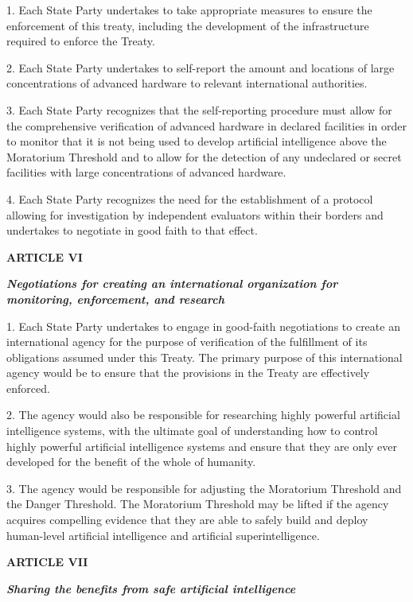 \documentclass[12pt,a4paper]{article}
\begin{document}
1. Each State Party undertakes to take appropriate measures to ensure the enforcement of this treaty, including the development of the infrastructure required to enforce the Treaty.

2. Each State Party undertakes to self-report the amount and locations of large concentrations of advanced hardware to relevant international authorities. 

3. Each State Party recognizes that the self-reporting procedure must allow for the comprehensive verification of advanced hardware in declared facilities in order to monitor that it is not being used to develop artificial intelligence above the Moratorium Threshold and to allow for the detection of any undeclared or secret facilities with large concentrations of advanced hardware.

4. Each State Party recognizes the need for the establishment of a protocol allowing for investigation by independent evaluators within their borders and undertakes to negotiate in good faith to that effect. 

\begin{center}

\textbf{{ARTICLE VI}}

\textbf{\textit{Negotiations for creating an international organization for monitoring, enforcement, and research }}
\end{center}


1. Each State Party undertakes to engage in good-faith negotiations to create an international agency for the purpose of verification of the fulfillment of its obligations assumed under this Treaty. The primary purpose of this international agency would be to ensure that the provisions in the Treaty are effectively enforced. 

2. The agency would also be responsible for researching highly powerful artificial intelligence systems, with the ultimate goal of understanding how to control highly powerful artificial intelligence systems and ensure that they are only ever developed for the benefit of the whole of humanity. 

3. The agency would be responsible for adjusting the Moratorium Threshold and the Danger Threshold. The Moratorium Threshold may be lifted if the agency acquires compelling evidence that they are able to safely build and deploy human-level artificial intelligence and artificial superintelligence. 

 \begin{center}

\textbf{{ARTICLE VII}}

\textbf{\textit{\textit{\textbf{\textit{\textbf{Sharing the benefits from safe artificial intelligence}} }}}}
\end{center}
\end{document}
